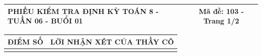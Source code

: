 \documentclass[12pt,a4paper]{article}
\begin{document}
\newpage


\noindent
\begin{tabularx}{\linewidth}{|X|c|}
\hline
\textbf{PHIẾU KIỂM TRA ĐỊNH KỲ TOÁN 8 - TUẦN 06 - BUỔI 01} & \textbf{Mã đề: 103 - Trang 1/2} \\
\hline
\end{tabularx}

\vspace{1mm}

\noindent
\begin{tabularx}{\linewidth}{|p{3.2cm}|X|}
\hline
\centering\textbf{ĐIỂM SỐ} & \centering\textbf{LỜI NHẬN XÉT CỦA THẦY CÔ} \tabularnewline
\hline
\rule{0pt}{1.8cm} & \tabularnewline
\hline
\end{tabularx}

\vspace{1.2mm}
\end{document}
